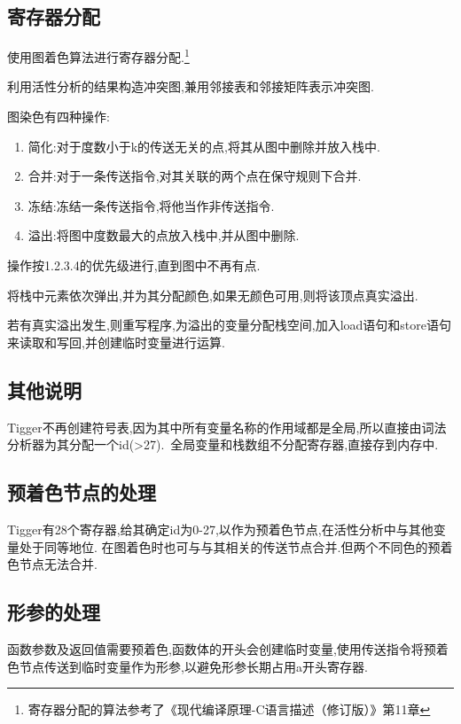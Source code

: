 \documentclass[UTF8]{article}
\begin{document}
\subsection{寄存器分配}
使用图着色算法进行寄存器分配.\footnote{寄存器分配的算法参考了《现代编译原理-C语言描述（修订版）》第11章}

利用活性分析的结果构造冲突图,兼用邻接表和邻接矩阵表示冲突图.

图染色有四种操作:
\begin{enumerate}[1.]
\item 简化:对于度数小于k的传送无关的点,将其从图中删除并放入栈中.
\item 合并:对于一条传送指令,对其关联的两个点在保守规则下合并.
\item 冻结:冻结一条传送指令,将他当作非传送指令.
\item 溢出:将图中度数最大的点放入栈中,并从图中删除.
\end{enumerate}
操作按1.2.3.4的优先级进行,直到图中不再有点.

将栈中元素依次弹出,并为其分配颜色,如果无颜色可用,则将该顶点真实溢出.

若有真实溢出发生,则重写程序,为溢出的变量分配栈空间,加入load语句和store语句来读取和写回,并创建临时变量进行运算.
\subsection{其他说明}
Tigger不再创建符号表,因为其中所有变量名称的作用域都是全局,所以直接由词法分析器为其分配一个id(>27).\
全局变量和栈数组不分配寄存器,直接存到内存中.
\subsection{预着色节点的处理}
Tigger有28个寄存器,给其确定id为0-27,以作为预着色节点,在活性分析中与其他变量处于同等地位. 在图着色时也可与与其相关的传送节点合并.但两个不同色的预着色节点无法合并.
\subsection{形参的处理}
函数参数及返回值需要预着色,函数体的开头会创建临时变量,使用传送指令将预着色节点传送到临时变量作为形参,以避免形参长期占用a开头寄存器.
\end{document}
